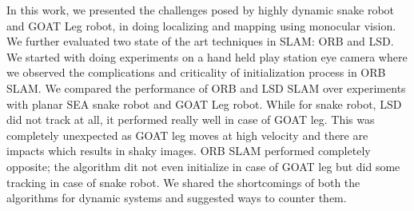In this work, we presented the challenges posed by highly dynamic snake robot and GOAT Leg robot, in doing localizing and mapping using monocular vision. We further evaluated two state of the art techniques in SLAM:  ORB and LSD. We started with doing experiments on a hand held play station eye camera where we observed the complications and criticality of initialization process in ORB SLAM. We compared the performance of ORB and LSD SLAM over experiments with planar SEA snake robot and GOAT Leg robot. While for snake robot, LSD did not track at all, it performed really well in case of GOAT leg. This was completely unexpected as GOAT leg moves at high velocity and there are impacts which results in shaky images. ORB SLAM performed completely opposite; the algorithm dit not even initialize in case of GOAT leg but did some tracking in case of snake robot. We shared the shortcomings of both the algorithms for dynamic systems and suggested ways to counter them.